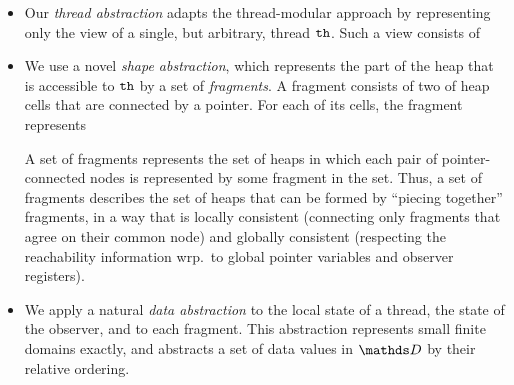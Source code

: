 \begin{itemize}
  \item
Our {\em thread abstraction}
adapts the thread-modular approach by representing only the view of a single, but arbitrary, thread ${\tt th}$. Such a view consists of
\item
We use a novel {\em shape abstraction}, which represents the part of the heap
that is accessible to ${\tt th}$ by a set of {\em fragments}. 
A fragment consists of two of heap cells that are connected by a pointer.
For each of its cells, the fragment represents
A set of fragments represents the set of heaps 
in which each pair of pointer-connected nodes is represented by some
fragment in the set.
Thus, a set of fragments describes the set of heaps
that can be formed by ``piecing together'' fragments, in a way that is
locally consistent (connecting only fragments that agree on their
common node) and globally consistent (respecting the reachability
information wrp.\ to global pointer variables and observer registers).
\item
We apply a natural {\em data abstraction} to the local state of a thread, the
state of the observer, and to each fragment. This abstraction
represents small finite domains exactly, and abstracts a set of
data values in $\ddomain$ by their relative ordering.
\end{itemize}
